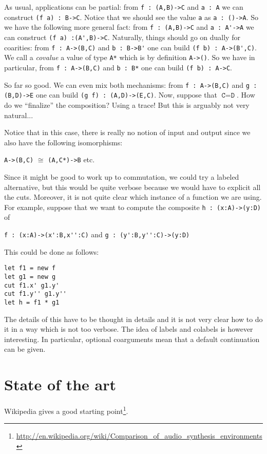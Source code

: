 \documentclass[a4paper,titlepage]{article}
\begin{document}
As usual, applications can be partial: from \verb|f : (A,B)->C| and \verb|a : A|
we can construct \verb|(f a) : B->C|. Notice that we should see the value
\verb|a| as \verb|a : ()->A|. So we have the following more general fact: from
\verb|f : (A,B)->C| and \verb|a : A'->A| we can construct
\verb|(f a) :(A',B)->C|. Naturally, things should go on dually for coarities:
from \verb|f : A->(B,C)| and \verb|b : B->B'| one can build
\verb|(f b) : A->(B',C)|. We call a \emph{covalue} a value of type \verb|A*|
which is by definition \verb|A->()|. So we have in particular, from
\verb|f : A->(B,C)| and \verb|b : B*| one can build \verb|(f b) : A->C|.

So far so good. We can even mix both mechanisms: from \verb|f : A->(B,C)| and
\verb|g : (B,D)->E| one can build \verb|(g f) : (A,D)->(E,C)|. Now, suppose that
$\texttt{C}=\texttt{D}$. How do we ``finalize'' the composition? Using a trace!
But this is arguably not very natural...

Notice that in this case, there is really no notion of input and output since we
also have the following isomorphisms:
\begin{center}
  \verb|A->(B,C)|
  \qquad$\cong$\qquad
  \verb|(A,C*)->B|
  \qquad
  etc.
\end{center}

Since it might be good to work up to commutation, we could try a labeled
alternative, but this would be quite verbose because we would have to explicit
all the cuts. Moreover, it is not quite clear which instance of a function we
are using. For example, suppose that we want to compute the composite
\verb|h : (x:A)->(y:D)| of
\begin{center}
  \verb|f : (x:A)->(x':B,x'':C)|
  \qquad and\qquad
  \verb|g : (y':B,y'':C)->(y:D)|
\end{center}
This could be done as follows:
\begin{verbatim}
let f1 = new f
let g1 = new g
cut f1.x' g1.y'
cut f1.y'' g1.y''
let h = f1 * g1
\end{verbatim}
The details of this have to be thought in details and it is not very clear how
to do it in a way which is not too verbose. The idea of labels and colabels is
however interesting. In particular, optional coarguments mean that a default
continuation can be given.

\section{State of the art}
Wikipedia gives a good starting
point\footnote{\url{http://en.wikipedia.org/wiki/Comparison_of_audio_synthesis_environments}}.
\end{document}
